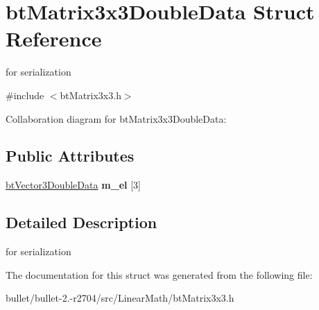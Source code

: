 \hypertarget{structbt_matrix3x3_double_data}{\section{bt\+Matrix3x3\+Double\+Data Struct Reference}
\label{structbt_matrix3x3_double_data}
}


for serialization  




{\ttfamily \#include $<$bt\+Matrix3x3.\+h$>$}



Collaboration diagram for bt\+Matrix3x3\+Double\+Data\+:
\subsection*{Public Attributes}
\begin{DoxyCompactItemize}
\item 
\hypertarget{structbt_matrix3x3_double_data_a22b10076f609771c948199604d50c704}{\hyperlink{structbt_vector3_double_data}{bt\+Vector3\+Double\+Data} {\bfseries m\+\_\+el} \mbox{[}3\mbox{]}}\label{structbt_matrix3x3_double_data_a22b10076f609771c948199604d50c704}

\end{DoxyCompactItemize}


\subsection{Detailed Description}
for serialization 

The documentation for this struct was generated from the following file\+:\begin{DoxyCompactItemize}
\item 
bullet/bullet-\/2.-\/r2704/src/\+Linear\+Math/bt\+Matrix3x3.\+h\end{DoxyCompactItemize}
